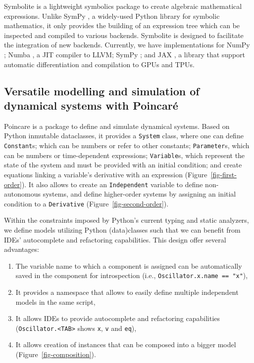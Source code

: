 \documentclass{article}
\providecommand{\tightlist}{%
  \setlength{\itemsep}{0pt}\setlength{\parskip}{0pt}}\usepackage{longtable,booktabs}
\begin{document}
Symbolite is a lightweight symbolics package to create algebraic mathematical expressions.
Unlike SymPy \cite{meurerSymPySymbolicComputing2017},
a widely-used Python library for symbolic mathematics,
it only provides the building of an expression tree
which can be inspected and compiled to various backends.
Symbolite is designed to facilitate the integration of new backends.
Currently, we have implementations for
NumPy \cite{harrisArrayProgrammingNumPy2020};
Numba \cite{lamNumbaLLVMbasedPython2015},
a \ac{JIT} compiler to LLVM;
SymPy \cite{meurerSymPySymbolicComputing2017};
and JAX \cite{jax2018github}, a
library that support automatic differentiation and compilation to \acp{GPU} and \acp{TPU}.

\hypertarget{versatile-modelling-and-simulation-of-dynamical-systems-with-poincaruxe9}{
  \subsection{Versatile modelling and simulation of dynamical systems with Poincaré}
  \label{versatile-modelling-and-simulation-of-dynamical-systems-with-poincaruxe9}
}

Poincare is a package to define and simulate dynamical systems.
Based on Python inmutable dataclasses,
it provides a \texttt{System} class,
where one can define
\texttt{Constant}s; which can be numbers or refer to other constants;
\texttt{Parameter}s, which can be numbers or time-dependent expressions;
\texttt{Variable}s, which represent the state of the system and must be provided with an initial condition;
and create equations linking a variable's derivative with an expression (Figure~\ref{fig-first-order}).
It also allows to
create an \texttt{Independent} variable to define non-autonomous systems,
and define higher-order systems by assigning an initial condition to a \texttt{Derivative} (Figure~\ref{fig-second-order}).

Within the constraints imposed by Python's current typing and static analyzers,
we define models utilizing Python (data)classes
such that we can benefit from \acp{IDE}' autocomplete and refactoring capabilities.
This design offer several advantages:

\begin{enumerate}
\def\labelenumi{\arabic{enumi}.}
\tightlist
\item
  The variable name to which a component is assigned can be automatically saved in the component for introspection
  (i.e., \texttt{Oscillator.x.name\ ==\ "x"}),
\item
  It provides a namespace that allows to easily define multiple independent models in the same script,
\item
  It allows \acp{IDE} to provide autocomplete and refactoring capabilities
  (\texttt{Oscillator.\textless{}TAB\textgreater{}} shows \texttt{x}, \texttt{v} and \texttt{eq}),
\item
  It allows creation of instances that can be composed into a bigger model (Figure~\ref{fig-composition}).
\end{enumerate}
\end{document}

